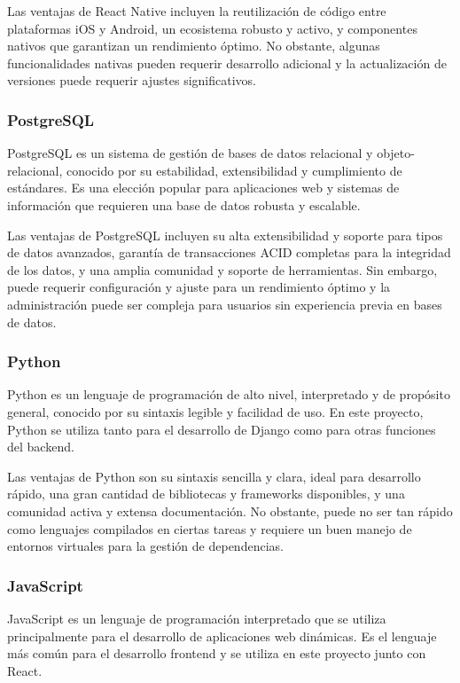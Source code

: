 Las ventajas de React Native incluyen la reutilización de código entre plataformas iOS y Android, un ecosistema robusto y activo, y componentes nativos que garantizan un rendimiento óptimo. No obstante, algunas funcionalidades nativas pueden requerir desarrollo adicional y la actualización de versiones puede requerir ajustes significativos.

\subsubsection{PostgreSQL}

PostgreSQL es un sistema de gestión de bases de datos relacional y objeto-relacional, conocido por su estabilidad, extensibilidad y cumplimiento de estándares. Es una elección popular para aplicaciones web y sistemas de información que requieren una base de datos robusta y escalable\cite{PostgreSQL}.

Las ventajas de PostgreSQL incluyen su alta extensibilidad y soporte para tipos de datos avanzados, garantía de transacciones ACID completas para la integridad de los datos, y una amplia comunidad y soporte de herramientas. Sin embargo, puede requerir configuración y ajuste para un rendimiento óptimo y la administración puede ser compleja para usuarios sin experiencia previa en bases de datos.

\subsubsection{Python}

Python es un lenguaje de programación de alto nivel, interpretado y de propósito general, conocido por su sintaxis legible y facilidad de uso. En este proyecto, Python se utiliza tanto para el desarrollo de Django como para otras funciones del backend\cite{Python}.

Las ventajas de Python son su sintaxis sencilla y clara, ideal para desarrollo rápido, una gran cantidad de bibliotecas y frameworks disponibles, y una comunidad activa y extensa documentación. No obstante, puede no ser tan rápido como lenguajes compilados en ciertas tareas y requiere un buen manejo de entornos virtuales para la gestión de dependencias.

\subsubsection{JavaScript}

JavaScript es un lenguaje de programación interpretado que se utiliza principalmente para el desarrollo de aplicaciones web dinámicas. Es el lenguaje más común para el desarrollo frontend y se utiliza en este proyecto junto con React\cite{JavaScript}.


